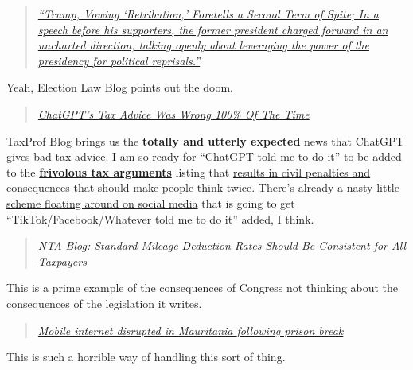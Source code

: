 \begin{quote}
\emph{\href{https://electionlawblog.org/?p=135000}{``Trump, Vowing
`Retribution,' Foretells a Second Term of Spite; In a speech before his
supporters, the former president charged forward in an uncharted
direction, talking openly about leveraging the power of the presidency
for political reprisals.''}}
\end{quote}

Yeah, Election Law Blog points out the doom.

\begin{quote}
\emph{\href{https://taxprof.typepad.com/taxprof_blog/2023/03/chatgpts-tax-advice-was-wrong-100-of-the-time.html}{ChatGPT's
Tax Advice Was Wrong 100\% Of The Time}}
\end{quote}

TaxProf Blog brings us the \textbf{totally and utterly expected} news
that ChatGPT gives bad tax advice. I am so ready for ``ChatGPT told me
to do it'' to be added to the
\textbf{\href{https://www.irs.gov/privacy-disclosure/the-truth-about-frivolous-tax-arguments-introduction}{frivolous
tax arguments}} listing that
\href{https://www.irs.gov/privacy-disclosure/the-truth-about-frivolous-tax-arguments-section-iii}{results
in civil penalties and consequences that should make people think
twice}. There's already a nasty little
\href{https://www.irs.gov/newsroom/irs-warns-taxpayers-of-new-filing-season-scams-involving-form-w-2-wages-those-filing-fake-returns-face-potential-penalties-investigation}{scheme
floating around on social media} that is going to get
``TikTok/Facebook/Whatever told me to do it'' added, I think.

\begin{quote}
\emph{\href{https://www.taxpayeradvocate.irs.gov/news/nta-blog-standard-mileage-deduction-rates/}{NTA
Blog: Standard Mileage Deduction Rates Should Be Consistent for All
Taxpayers}}
\end{quote}

This is a prime example of the consequences of Congress not thinking
about the consequences of the legislation it writes.

\begin{quote}
\emph{\href{https://netblocks.org/reports/mobile-internet-disrupted-in-mauritania-following-prison-break-3An41by2}{Mobile
internet disrupted in Mauritania following prison break}}
\end{quote}

This is such a horrible way of handling this sort of thing.


